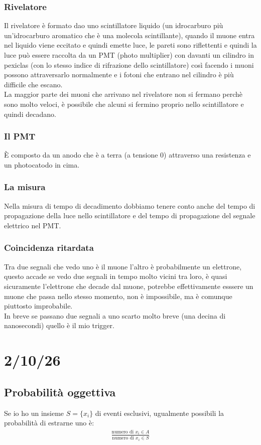 \documentclass[a4paper, oneside]{article}
\begin{document}
\subsubsection{Rivelatore}
Il rivelatore è formato dao uno scintillatore liquido (un idrocarburo più un'idrocarburo aromatico che è una molecola scintillante), quando il muone entra nel liquido viene eccitato e quindi emette luce, le pareti sono riflettenti e quindi la luce può essere raccolta da un PMT (photo multiplier) con davanti un cilindro in pexiclas (con lo stesso indice di rifrazione dello scintillatore) così facendo i muoni possono attraversarlo normalmente e i fotoni che entrano nel cilindro è più difficile che escano.\\
La maggior parte dei muoni che arrivano nel rivelatore non si fermano perchè sono molto veloci, è possibile che alcuni si fermino proprio nello scintillatore e quindi decadano.\\
\subsubsection{Il PMT}
È composto da un anodo che è a terra (a tensione 0) attraverso una resistenza e un photocatodo in cima.
\subsubsection{La misura}
Nella misura di tempo di decadimento dobbiamo tenere conto anche del tempo di propagazione della luce nello scintillatore e del tempo di propagazione del segnale elettrico nel PMT.

\subsubsection{Coincidenza ritardata}
Tra due segnali che vedo uno è il muone l'altro è probabilmente un elettrone, questo accade se vedo due segnali in tempo molto vicini tra loro, è quasi sicuramente l'elettrone che decade dal muone, potrebbe effettivamente esssere un muone che passa nello stesso momento, non è impossibile, ma è comunque piuttosto improbabile.\\
In breve se passano due segnali a uno scarto molto breve (una decina di nanosecondi) quello è il mio trigger. 

\section{2/10/26}
\subsection{Probabilità oggettiva}
Se io ho un insieme $S=\{x_i\}$ di eventi esclusivi, ugualmente possibili la probabilità di estrarne uno è:
\begin{gather*}
    \frac{\text{numero di }x_i \in A}{\text{numero di }x_i \in S}
\end{gather*}
\end{document}
